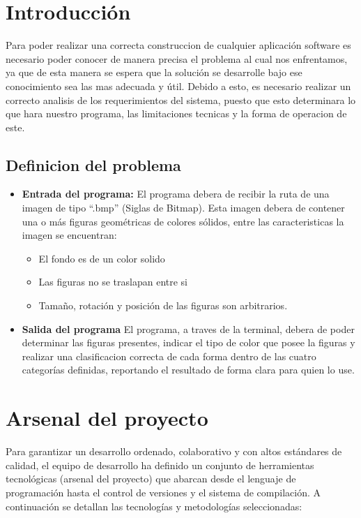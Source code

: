 \documentclass[11pt,a4paper]{article}
\begin{document}
\section{Introducción}
Para poder realizar una correcta construccion de cualquier aplicación software es necesario poder conocer de manera precisa el problema al cual nos
enfrentamos, ya que de esta manera se espera que la solución se desarrolle bajo ese conocimiento sea las mas adecuada y útil. Debido a esto, es necesario realizar un correcto analisis de los requerimientos del sistema, puesto que esto determinara lo que hara nuestro programa, las limitaciones tecnicas y la forma de operacion de este.

\subsection{Definicion del problema}
\begin{itemize}
  
\item \textbf{Entrada del programa:} El programa debera de recibir la ruta de una imagen de tipo ``.bmp'' (Siglas de Bitmap). Esta imagen debera de contener una o más figuras geométricas de colores sólidos, entre las caracteristicas la imagen se encuentran:
  \begin{itemize}
  \item El fondo es de un color solido
  \item Las figuras no se traslapan entre si
  \item Tamaño, rotación y posición de las figuras son arbitrarios. 
  \end{itemize}
  
    \item \textbf{Salida del programa} El programa, a traves de la terminal, debera de poder determinar las figuras presentes, indicar el tipo de  color que posee la figuras y realizar una clasificacion correcta de cada forma dentro de las cuatro categorías definidas, reportando el resultado de forma clara para quien lo use.
\end{itemize}

\section{Arsenal del proyecto}

Para garantizar un desarrollo ordenado, colaborativo y con altos estándares de calidad, el equipo de desarrollo ha definido un conjunto de herramientas tecnológicas (arsenal del proyecto) que abarcan desde el lenguaje de programación hasta el control de versiones y el sistema de compilación. A continuación se detallan las tecnologías y metodologías seleccionadas:
\end{document}

